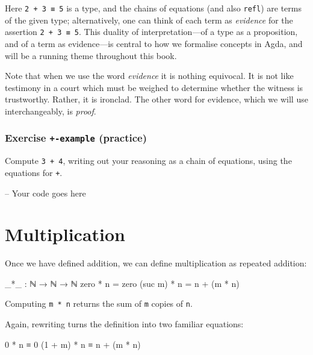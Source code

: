 Here \texttt{2\ +\ 3\ ≡\ 5} is a type, and the chains of equations (and
also \texttt{refl}) are terms of the given type; alternatively, one can
think of each term as \emph{evidence} for the assertion
\texttt{2\ +\ 3\ ≡\ 5}. This duality of interpretation---of a type as a
proposition, and of a term as evidence---is central to how we formalise
concepts in Agda, and will be a running theme throughout this book.

Note that when we use the word \emph{evidence} it is nothing equivocal.
It is not like testimony in a court which must be weighed to determine
whether the witness is trustworthy. Rather, it is ironclad. The other
word for evidence, which we will use interchangeably, is \emph{proof}.

\hypertarget{Naturals-plus-example}{%
\subsubsection{\texorpdfstring{Exercise \texttt{+-example}
(practice)}{Exercise +-example (practice)}}\label{Naturals-plus-example}}

Compute \texttt{3\ +\ 4}, writing out your reasoning as a chain of
equations, using the equations for \texttt{+}.

\begin{fence}
\begin{code}
-- Your code goes here
\end{code}
\end{fence}

\hypertarget{multiplication}{%
\section{Multiplication}\label{multiplication}}

Once we have defined addition, we can define multiplication as repeated
addition:

\begin{fence}
\begin{code}
_*_ : ℕ → ℕ → ℕ
zero    * n  =  zero
(suc m) * n  =  n + (m * n)
\end{code}
\end{fence}

Computing \texttt{m\ *\ n} returns the sum of \texttt{m} copies of
\texttt{n}.

Again, rewriting turns the definition into two familiar equations:

\begin{myDisplay}
0       * n  ≡  0
(1 + m) * n  ≡  n + (m * n)
\end{myDisplay}

